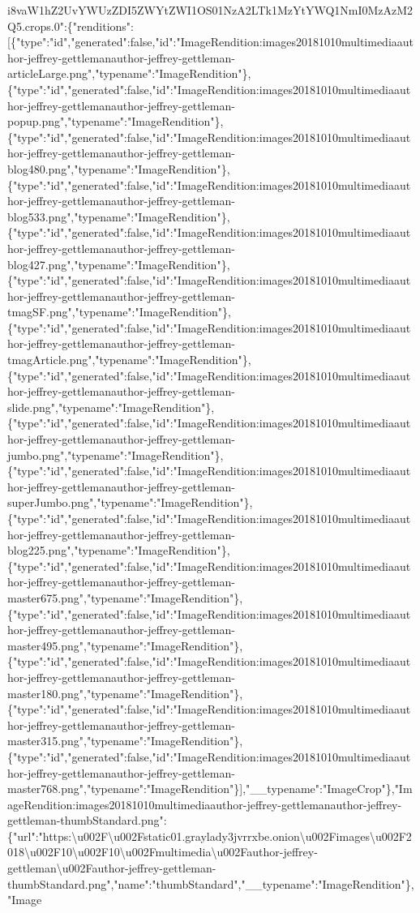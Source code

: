i8vaW1hZ2UvYWUzZDI5ZWYtZWI1OS01NzA2LTk1MzYtYWQ1NmI0MzAzM2Q5.crops.0":\{"renditions":{[}\{"type":"id","generated":false,"id":"ImageRendition:images20181010multimediaauthor-jeffrey-gettlemanauthor-jeffrey-gettleman-articleLarge.png","typename":"ImageRendition"\},\{"type":"id","generated":false,"id":"ImageRendition:images20181010multimediaauthor-jeffrey-gettlemanauthor-jeffrey-gettleman-popup.png","typename":"ImageRendition"\},\{"type":"id","generated":false,"id":"ImageRendition:images20181010multimediaauthor-jeffrey-gettlemanauthor-jeffrey-gettleman-blog480.png","typename":"ImageRendition"\},\{"type":"id","generated":false,"id":"ImageRendition:images20181010multimediaauthor-jeffrey-gettlemanauthor-jeffrey-gettleman-blog533.png","typename":"ImageRendition"\},\{"type":"id","generated":false,"id":"ImageRendition:images20181010multimediaauthor-jeffrey-gettlemanauthor-jeffrey-gettleman-blog427.png","typename":"ImageRendition"\},\{"type":"id","generated":false,"id":"ImageRendition:images20181010multimediaauthor-jeffrey-gettlemanauthor-jeffrey-gettleman-tmagSF.png","typename":"ImageRendition"\},\{"type":"id","generated":false,"id":"ImageRendition:images20181010multimediaauthor-jeffrey-gettlemanauthor-jeffrey-gettleman-tmagArticle.png","typename":"ImageRendition"\},\{"type":"id","generated":false,"id":"ImageRendition:images20181010multimediaauthor-jeffrey-gettlemanauthor-jeffrey-gettleman-slide.png","typename":"ImageRendition"\},\{"type":"id","generated":false,"id":"ImageRendition:images20181010multimediaauthor-jeffrey-gettlemanauthor-jeffrey-gettleman-jumbo.png","typename":"ImageRendition"\},\{"type":"id","generated":false,"id":"ImageRendition:images20181010multimediaauthor-jeffrey-gettlemanauthor-jeffrey-gettleman-superJumbo.png","typename":"ImageRendition"\},\{"type":"id","generated":false,"id":"ImageRendition:images20181010multimediaauthor-jeffrey-gettlemanauthor-jeffrey-gettleman-blog225.png","typename":"ImageRendition"\},\{"type":"id","generated":false,"id":"ImageRendition:images20181010multimediaauthor-jeffrey-gettlemanauthor-jeffrey-gettleman-master675.png","typename":"ImageRendition"\},\{"type":"id","generated":false,"id":"ImageRendition:images20181010multimediaauthor-jeffrey-gettlemanauthor-jeffrey-gettleman-master495.png","typename":"ImageRendition"\},\{"type":"id","generated":false,"id":"ImageRendition:images20181010multimediaauthor-jeffrey-gettlemanauthor-jeffrey-gettleman-master180.png","typename":"ImageRendition"\},\{"type":"id","generated":false,"id":"ImageRendition:images20181010multimediaauthor-jeffrey-gettlemanauthor-jeffrey-gettleman-master315.png","typename":"ImageRendition"\},\{"type":"id","generated":false,"id":"ImageRendition:images20181010multimediaauthor-jeffrey-gettlemanauthor-jeffrey-gettleman-master768.png","typename":"ImageRendition"\}{]},"\_\_typename":"ImageCrop"\},"ImageRendition:images20181010multimediaauthor-jeffrey-gettlemanauthor-jeffrey-gettleman-thumbStandard.png":\{"url":"https:\textbackslash{}u002F\textbackslash{}u002Fstatic01.graylady3jvrrxbe.onion\textbackslash{}u002Fimages\textbackslash{}u002F2018\textbackslash{}u002F10\textbackslash{}u002F10\textbackslash{}u002Fmultimedia\textbackslash{}u002Fauthor-jeffrey-gettleman\textbackslash{}u002Fauthor-jeffrey-gettleman-thumbStandard.png","name":"thumbStandard","\_\_typename":"ImageRendition"\},"Image